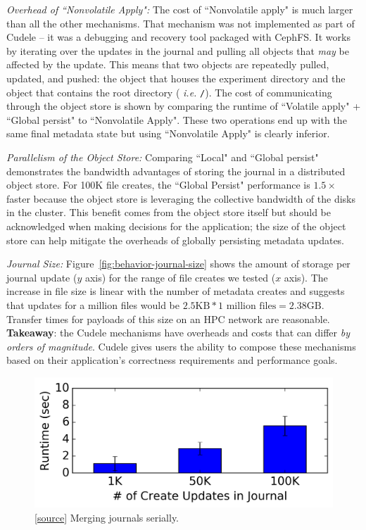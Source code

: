 {\it Overhead of ``Nonvolatile Apply":} The cost of ``Nonvolatile
apply" is much larger than all the other mechanisms.  That mechanism was not
implemented as part of Cudele -- it was a debugging and recovery tool packaged
with CephFS. It works by iterating over the updates in the journal and pulling
all objects that {\it may} be affected by the update.  This means that two
objects are repeatedly pulled, updated, and pushed: the object that houses the
experiment directory and the object that contains the root directory ({\it
i.e.} \texttt{/}).  The cost of communicating through the object store is shown
by comparing the runtime of ``Volatile apply" + ``Global persist" to
``Nonvolatile Apply". These two operations end up with the same final metadata
state but using ``Nonvolatile Apply" is clearly inferior.

{\it Parallelism of the Object Store:} Comparing ``Local" and ``Global
persist" demonstrates the bandwidth advantages of storing the journal in a
distributed object store. For 100K file creates, the ``Global Persist"
performance is \(1.5\times\) faster because the object store is leveraging the
collective bandwidth of the disks in the cluster. This benefit comes from the
object store itself but should be acknowledged when making decisions for the
application; the size of the object store can help mitigate the overheads of
globally persisting metadata updates.

{\it Journal Size:} Figure~\ref{fig:behavior-journal-size} shows the
amount of storage per journal update (\(y\) axis) for the range of file creates
we tested (\(x\) axis). The increase in file size is linear with the number of
metadata creates and suggests that updates for a million files would be
\(2.5\text{KB}*1\text{ million files} = 2.38\text{GB}\). Transfer times for
payloads of this size on an HPC network are reasonable.\\

\noindent\textbf{Takeaway}: the Cudele mechanisms have overheads and costs
that can differ {\it by orders of magnitude}. Cudele gives users the ability
to compose these mechanisms based on their application's correctness
requirements and performance goals.\\

\begin{figure}[tb]
\centering
\includegraphics[width=1.0\linewidth]{graphs/merge-a.png}
\caption{ [\href{https://...}{source}] Merging journals serially.}
\label{fig:merge}
\end{figure}

